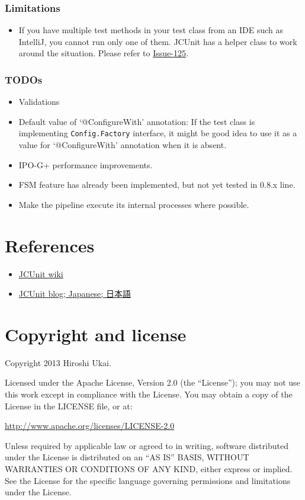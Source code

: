 \subsubsection{Limitations}\label{limitations}

\begin{itemize}
\tightlist
\item
  If you have multiple test methods in your test class from an IDE such
  as IntelliJ, you cannot run only one of them. JCUnit has a helper
  class to work around the situation. Please refer to
  \href{https://github.com/dakusui/jcunit/issues/125}{Issue-125}.
\end{itemize}

\subsubsection{TODOs}\label{todos}

\begin{itemize}
\tightlist
\item
  Validations
\item
  Default value of `@ConfigureWith' annotation: If the test class is
  implementing \texttt{Config.Factory} interface, it might be good idea
  to use it as a value for `@ConfigureWith' annotation when it is
  absent.
\item
  IPO-G+ performance improvements.
\item
  FSM feature has already been implemented, but not yet tested in 0.8.x
  line.
\item
  Make the pipeline execute its internal processes where possible.
\end{itemize}

\section{References}\label{references}

\begin{itemize}
\tightlist
\item
  \href{https://github.com/dakusui/jcunit/wiki}{JCUnit wiki}
\item
  \href{http://jcunit.hatenablog.jp/}{JCUnit blog; Japanese; 日本語}
\end{itemize}

\section{Copyright and license}\label{copyright-and-license}

Copyright 2013 Hiroshi Ukai.

Licensed under the Apache License, Version 2.0 (the ``License''); you
may not use this work except in compliance with the License. You may
obtain a copy of the License in the LICENSE file, or at:

\url{http://www.apache.org/licenses/LICENSE-2.0}

Unless required by applicable law or agreed to in writing, software
distributed under the License is distributed on an ``AS IS'' BASIS,
WITHOUT WARRANTIES OR CONDITIONS OF ANY KIND, either express or implied.
See the License for the specific language governing permissions and
limitations under the License.
